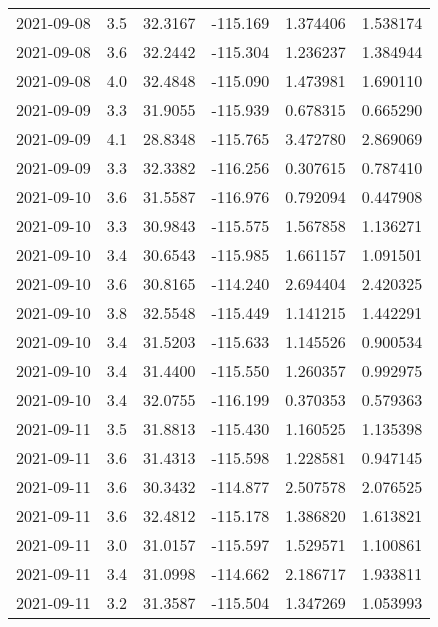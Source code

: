 \begin{tabular}{lrrrrr}
2021-09-08 &       3.5 &  32.3167 &  -115.169 &         1.374406 &         1.538174 \\
2021-09-08 &       3.6 &  32.2442 &  -115.304 &         1.236237 &         1.384944 \\
2021-09-08 &       4.0 &  32.4848 &  -115.090 &         1.473981 &         1.690110 \\
2021-09-09 &       3.3 &  31.9055 &  -115.939 &         0.678315 &         0.665290 \\
2021-09-09 &       4.1 &  28.8348 &  -115.765 &         3.472780 &         2.869069 \\
2021-09-09 &       3.3 &  32.3382 &  -116.256 &         0.307615 &         0.787410 \\
2021-09-10 &       3.6 &  31.5587 &  -116.976 &         0.792094 &         0.447908 \\
2021-09-10 &       3.3 &  30.9843 &  -115.575 &         1.567858 &         1.136271 \\
2021-09-10 &       3.4 &  30.6543 &  -115.985 &         1.661157 &         1.091501 \\
2021-09-10 &       3.6 &  30.8165 &  -114.240 &         2.694404 &         2.420325 \\
2021-09-10 &       3.8 &  32.5548 &  -115.449 &         1.141215 &         1.442291 \\
2021-09-10 &       3.4 &  31.5203 &  -115.633 &         1.145526 &         0.900534 \\
2021-09-10 &       3.4 &  31.4400 &  -115.550 &         1.260357 &         0.992975 \\
2021-09-10 &       3.4 &  32.0755 &  -116.199 &         0.370353 &         0.579363 \\
2021-09-11 &       3.5 &  31.8813 &  -115.430 &         1.160525 &         1.135398 \\
2021-09-11 &       3.6 &  31.4313 &  -115.598 &         1.228581 &         0.947145 \\
2021-09-11 &       3.6 &  30.3432 &  -114.877 &         2.507578 &         2.076525 \\
2021-09-11 &       3.6 &  32.4812 &  -115.178 &         1.386820 &         1.613821 \\
2021-09-11 &       3.0 &  31.0157 &  -115.597 &         1.529571 &         1.100861 \\
2021-09-11 &       3.4 &  31.0998 &  -114.662 &         2.186717 &         1.933811 \\
2021-09-11 &       3.2 &  31.3587 &  -115.504 &         1.347269 &         1.053993 \\

\end{tabular}
